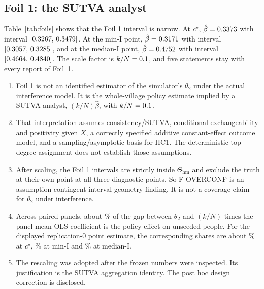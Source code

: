 \documentclass[11pt]{article}
\newcommand{\hm}{\mathrm{hm}}
\begin{document}
\subsection{Foil 1: the SUTVA analyst}
Table~\ref{tab:foils} shows that the Foil 1 interval is narrow. At $c^\star$,
$\hat\beta=0.3373$ with interval $[0.3267,\,0.3479]$. At the
min-I point, $\hat\beta=0.3171$ with interval $[0.3057,\,0.3285]$, and at the median-I point, $\hat\beta=0.4752$ with
interval $[0.4664,\,0.4840]$. The scale factor is $k/N=0.1$, and five statements stay with
every report of Foil~1.
\begin{enumerate}
  \item Foil 1 is not an identified estimator of the simulator's
        $\theta_2$ under the actual interference model. It is the
        whole-village policy estimate implied by a SUTVA analyst,
        $(k/N)\hat\beta$, with $k/N=0.1$.
  \item That interpretation assumes consistency/SUTVA, conditional
        exchangeability and positivity given $X$, a correctly specified
        additive constant-effect outcome model, and a
        sampling/asymptotic basis for HC1. The deterministic top-degree
        assignment does not establish those assumptions.
  \item After scaling, the Foil 1 intervals are strictly inside
        $\Theta_{\hm}$ and exclude the truth at their own point at all three diagnostic points. So
        F-OVERCONF is an assumption-contingent
        interval-geometry finding. It is not a coverage claim for
        $\theta_2$ under interference.
  \item Across \RepsEstimand{} paired panels, about \UnseededShareMeanBetaPct\% of the gap between
        $\theta_2$ and $(k/N)$ times the \RepsEstimand-panel mean OLS
        coefficient is the policy effect on unseeded people. For the
        displayed replication-0 point estimate, the corresponding
        shares are about \StarPtUnseededShareDisplayedPct\% at $c^\star$, \MinIUnseededShareDisplayedPct\% at min-I and \MedIUnseededShareDisplayedPct\% at median-I.
  \item The rescaling was adopted after the frozen numbers were
        inspected. Its justification is the SUTVA aggregation identity.
        The post hoc design correction is disclosed.
\end{enumerate}
\end{document}
